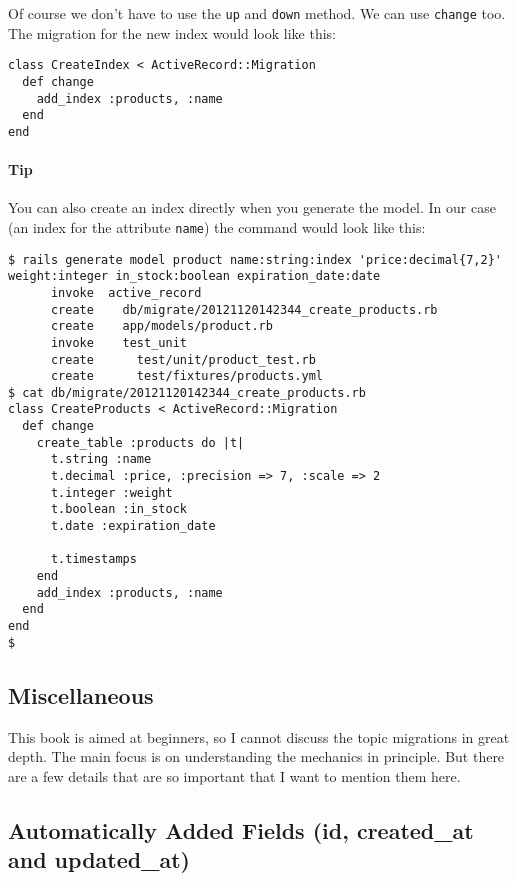 \documentclass[a4paper]{book}
\newcounter{tab}[chapter]
\begin{document}
Of course we don't have to use the \texttt{up} and \texttt{down} method. We can use \texttt{change} too. The migration for the new index would look like this:

\begin{shaded}\begin{verbatim}
class CreateIndex < ActiveRecord::Migration
  def change
    add_index :products, :name
  end
end
\end{verbatim}\end{shaded}

\paragraph{Tip}\label{tip-13}

You can also create an index directly when you generate the model. In our case (an index for the attribute \texttt{name}) the command would look like this:

\begin{shaded}\begin{verbatim}
$ rails generate model product name:string:index 'price:decimal{7,2}' weight:integer in_stock:boolean expiration_date:date
      invoke  active_record
      create    db/migrate/20121120142344_create_products.rb
      create    app/models/product.rb
      invoke    test_unit
      create      test/unit/product_test.rb
      create      test/fixtures/products.yml
$ cat db/migrate/20121120142344_create_products.rb
class CreateProducts < ActiveRecord::Migration
  def change
    create_table :products do |t|
      t.string :name
      t.decimal :price, :precision => 7, :scale => 2
      t.integer :weight
      t.boolean :in_stock
      t.date :expiration_date

      t.timestamps
    end
    add_index :products, :name
  end
end
$
\end{verbatim}\end{shaded}

\subsection{Miscellaneous}\label{miscellaneous-1}

This book is aimed at beginners, so I cannot discuss the topic migrations in great depth. The main focus is on understanding the mechanics in principle. But there are a few details that are so important that I want to mention them here.

\subsection{Automatically Added Fields (id, created\_at and updated\_at)}\label{automatically-added-fields-id-createdux5fat-and-updatedux5fat}
\end{document}
